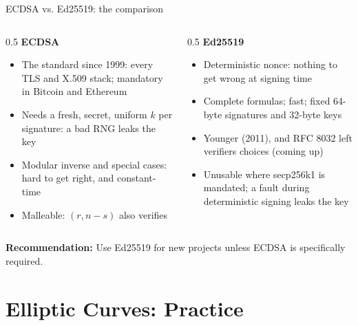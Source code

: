 \ifdefined\PRESENTATION\else\PassOptionsToClass{handout}{beamer}\fi\documentclass[aspectratio=169, lualatex]{beamer}
\begin{document}
\begin{frame}{ECDSA vs. Ed25519: the comparison}
	\begin{columns}[t]
		\begin{column}{0.5\textwidth}
			\textbf{ECDSA}
			\begin{itemize}
				\item[$+$] The standard since 1999: every TLS and X.509 stack; mandatory in Bitcoin and Ethereum
				\item[$-$] Needs a fresh, secret, uniform $k$ per signature: a bad RNG leaks the key
				\item[$-$] Modular inverse and special cases: hard to get right, and constant-time
				\item[$-$] Malleable: $(r, n - s)$ also verifies
			\end{itemize}
		\end{column}
		\begin{column}{0.5\textwidth}
			\textbf{Ed25519}
			\begin{itemize}
				\item[$+$] Deterministic nonce: nothing to get wrong at signing time
				\item[$+$] Complete formulas; fast; fixed 64-byte signatures and 32-byte keys
				\item[$-$] Younger (2011), and RFC 8032 left verifiers choices (coming up)
				\item[$-$] Unusable where secp256k1 is mandated; a fault during deterministic signing leaks the key
			\end{itemize}
		\end{column}
	\end{columns}
	\vspace{0.3cm}
	\textbf{Recommendation:} Use Ed25519 for new projects unless ECDSA is specifically required.
\end{frame}

\section{Elliptic Curves: Practice}
\end{document}
